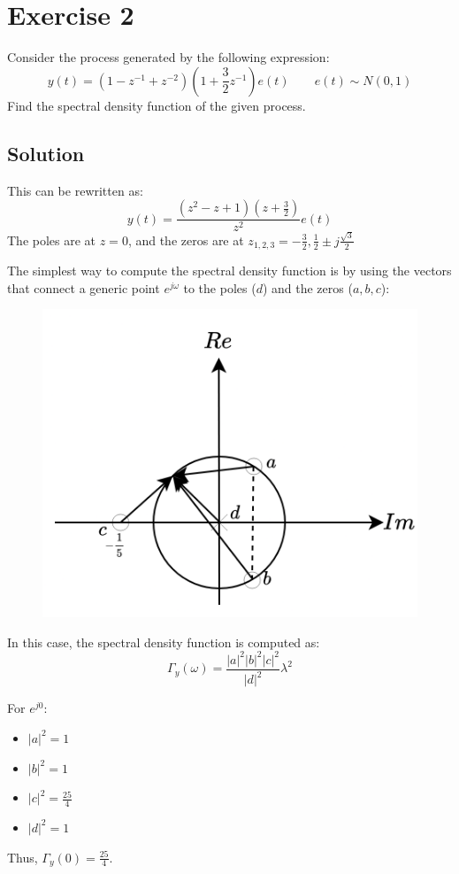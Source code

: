 \section{Exercise 2}

Consider the process generated by the following expression:
\[y(t)=\left( 1-z^{-1}+z^{-2} \right)\left( 1+\dfrac{3}{2}z^{-1}\right)e(t)\qquad e(t)\sim N(0,1)\]
Find the spectral density function of the given process.

\subsection*{Solution}
This can be rewritten as:
\[y(t)=\dfrac{\left(z^2-z+1\right)\left( z+\frac{3}{2} \right)}{z^2}e(t)\]
The poles are at $z=0$, and the zeros are at $z_{1,2,3}=-\frac{3}{2},\frac{1}{2}\pm j\frac{\sqrt{3}}{2}$

The simplest way to compute the spectral density function is by using the vectors that connect a generic point $e^{j\omega}$ to the poles ($d$) and the zeros ($a,b,c$):
\begin{figure}[H]
    \centering
    \includegraphics[width=0.5\linewidth]{images/spec1.png}
\end{figure}
In this case, the spectral density function is computed as:
\[\Gamma_y(\omega)=\dfrac{\left\lvert a \right\rvert^2\left\lvert b \right\rvert^2\left\lvert c \right\rvert^2}{\left\lvert d \right\rvert^2}\lambda^2\]

For $e^{j0}$:
\begin{itemize}
    \item $\left\lvert a \right\rvert^2=1$
    \item $\left\lvert b \right\rvert^2=1$
    \item $\left\lvert c \right\rvert^2=\frac{25}{4}$
    \item $\left\lvert d \right\rvert^2=1$
\end{itemize}
Thus, $\Gamma_y(0)=\frac{25}{4}$.

